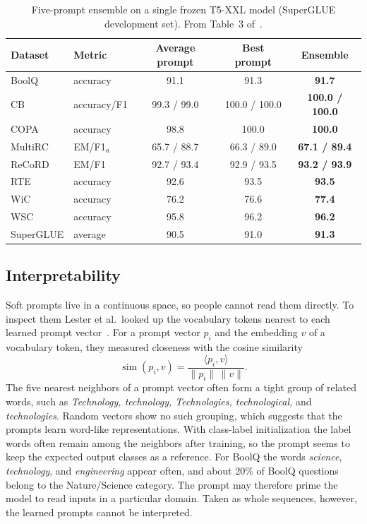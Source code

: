 \documentclass[12pt]{article}
\begin{document}
\begin{table}[htbp]
  \centering
  \caption{Five-prompt ensemble on a single frozen T5-XXL model (SuperGLUE development set).
    From Table~3 of~\cite{lester2021}.}
  \label{tab:ensemble}
  \small
  \begin{tabular}{@{}l l c c c@{}}
    \toprule
    \textbf{Dataset} & \textbf{Metric} & \textbf{Average prompt} & \textbf{Best prompt} & \textbf{Ensemble}\\
    \midrule
    BoolQ   & accuracy    & 91.1        & 91.3          & \textbf{91.7}\\
    CB      & accuracy/F1 & 99.3 / 99.0 & 100.0 / 100.0 & \textbf{100.0 / 100.0}\\
    COPA    & accuracy    & 98.8        & 100.0         & \textbf{100.0}\\
    MultiRC & EM/F1$_a$   & 65.7 / 88.7 & 66.3 / 89.0   & \textbf{67.1 / 89.4}\\
    ReCoRD  & EM/F1       & 92.7 / 93.4 & 92.9 / 93.5   & \textbf{93.2 / 93.9}\\
    RTE     & accuracy    & 92.6        & 93.5          & \textbf{93.5}\\
    WiC     & accuracy    & 76.2        & 76.6          & \textbf{77.4}\\
    WSC     & accuracy    & 95.8        & 96.2          & \textbf{96.2}\\
    \midrule
    SuperGLUE & average   & 90.5        & 91.0          & \textbf{91.3}\\
    \bottomrule
  \end{tabular}
\end{table}

\subsection{Interpretability}\label{sec:interpret}

Soft prompts live in a continuous space, so people cannot read them directly. To inspect
them Lester et al.\ looked up the vocabulary tokens nearest to each learned prompt
vector~\cite{lester2021}. For a prompt vector $p_i$ and the embedding $v$ of a vocabulary
token, they measured closeness with the cosine similarity
\begin{equation}
  \operatorname{sim}(p_i,v)=\frac{\langle p_i,v\rangle}{\lVert p_i\rVert\,\lVert v\rVert}.
  \label{eq:cosine}
\end{equation}
The five nearest neighbors
of a prompt vector often form a tight group of related words, such as \emph{Technology,
technology, Technologies, technological,} and \emph{technologies}. Random vectors show no such
grouping, which suggests that the prompts learn word-like representations. With class-label
initialization the label words often remain among the neighbors after training, so the prompt
seems to keep the expected output classes as a reference. For BoolQ the words
\emph{science}, \emph{technology}, and \emph{engineering} appear often, and about 20\% of
BoolQ questions belong to the Nature/Science category. The prompt may therefore prime the
model to read inputs in a particular domain. Taken as whole sequences, however, the learned
prompts cannot be interpreted.
\end{document}
